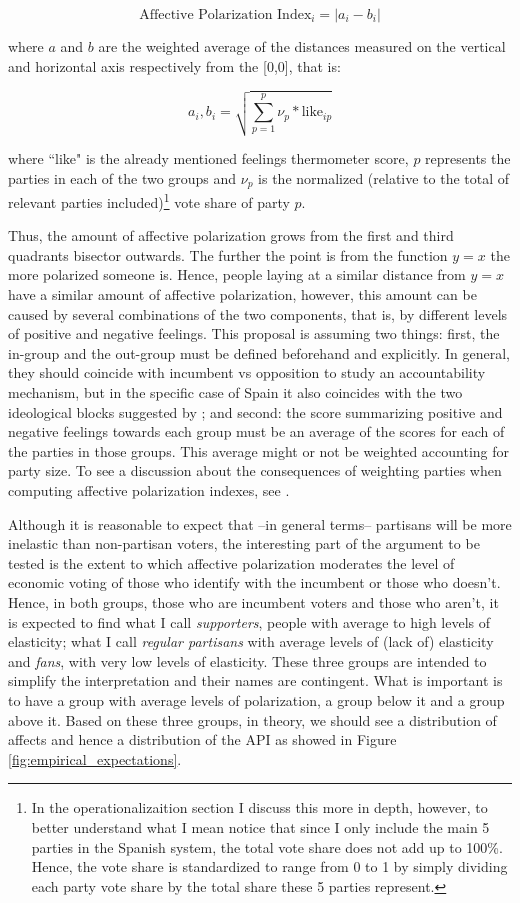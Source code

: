 \documentclass[a4paper, svgnames]{article}
\begin{document}
$$
	\text{Affective Polarization Index}_i = \lvert a_i - b_i \rvert
$$

where $a$ and $b$ are the weighted average of the distances measured on the vertical and horizontal axis respectively from the [0,0], that is:

$$
	a_i, b_i = \sqrt{\sum^p_{p=1}{\nu_p*\text{like}_{ip}}}
$$

where ``like" is the already mentioned feelings thermometer score, $p$ represents the parties in each of the two groups and $\nu_p$ is the normalized (relative to the total of relevant parties included)\footnote{In the operationalizaition section I discuss this more in depth, however, to better understand what I mean notice that since I only include the main 5 parties in the Spanish system, the total vote share does not add up to 100\%. Hence, the vote share is standardized to range from 0 to 1 by simply dividing each party vote share by the total share these 5 parties represent.} vote share of party $p$.

Thus, the amount of affective polarization grows from the first and third quadrants bisector outwards. The further the point is from the function $y=x$ the more polarized someone is. Hence, people laying at a similar distance from $y=x$ have a similar amount of affective polarization, however, this amount can be caused by several combinations of the two components, that is, by different levels of positive and negative feelings. This proposal is assuming two things: first, the in-group and the out-group must be defined beforehand and explicitly. In general, they should coincide with incumbent vs opposition to study an accountability mechanism, but in the specific case of Spain it also coincides with the two ideological blocks suggested by \citet*{Orriols2020}; and second: the score summarizing positive and negative feelings towards each group must be an average of the scores for each of the parties in those groups. This average might or not be weighted accounting for party size. To see a discussion about the consequences of weighting parties when computing affective polarization indexes, see \citet*{Wagner2021}.

Although it is reasonable to expect that --in general terms-- partisans will be more inelastic than non-partisan voters, the interesting part of the argument to be tested is the extent to which affective polarization moderates the level of economic voting of those who identify with the incumbent or those who doesn't. Hence, in both groups, those who are incumbent voters and those who aren't, it is expected to find what I call \textit{supporters}, people with average to high levels of elasticity; what I call \textit{regular partisans} with average levels of (lack of) elasticity and \textit{fans}, with very low levels of elasticity. These three groups are intended to simplify the interpretation and their names are contingent. What is important is to have a group with average levels of polarization, a group below it and a group above it. Based on these three groups, in theory, we should see a distribution of affects and hence a distribution of the API as showed in Figure \ref{fig:empirical_expectations}.
\end{document}
